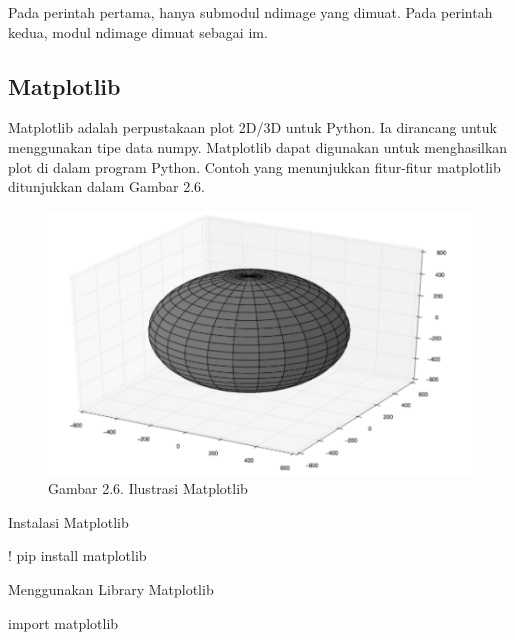 \documentclass[
  letterpaper,
  DIV=11,
  numbers=noendperiod]{scrreprt}
\newenvironment{Shaded}{\begin{snugshade}}{\end{snugshade}}
\newcommand{\ImportTok}[1]{\textcolor[rgb]{0.00,0.46,0.62}{#1}}
\newcommand{\NormalTok}[1]{\textcolor[rgb]{0.00,0.23,0.31}{#1}}
\newcommand{\OperatorTok}[1]{\textcolor[rgb]{0.37,0.37,0.37}{#1}}
\begin{document}
Pada perintah pertama, hanya submodul ndimage yang dimuat. Pada perintah
kedua, modul ndimage dimuat sebagai im.

\hypertarget{matplotlib}{%
\subsection*{Matplotlib}\label{matplotlib}}

Matplotlib adalah perpustakaan plot 2D/3D untuk Python. Ia dirancang
untuk menggunakan tipe data numpy. Matplotlib dapat digunakan untuk
menghasilkan plot di dalam program Python. Contoh yang menunjukkan
fitur-fitur matplotlib ditunjukkan dalam Gambar 2.6.

\begin{figure}

{\centering \includegraphics{Asset/image11.png}

}

\caption{Gambar 2.6. Ilustrasi Matplotlib}

\end{figure}

Instalasi Matplotlib

\begin{Shaded}
\begin{Highlighting}[]
\OperatorTok{!}\NormalTok{ pip install matplotlib}
\end{Highlighting}
\end{Shaded}

Menggunakan Library Matplotlib

\begin{Shaded}
\begin{Highlighting}[]
\ImportTok{import}\NormalTok{ matplotlib}
\end{Highlighting}
\end{Shaded}
\end{document}
